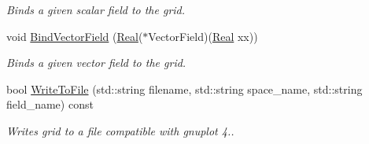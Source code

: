 \begin{DoxyCompactItemize}
\begin{DoxyCompactList}\small\item\em Binds a given scalar field to the grid. \end{DoxyCompactList}\item 
void \hyperlink{classmtk_1_1UniStgGrid1D_a5703f1f875f52f6de8f7db5a6250fafa}{Bind\+Vector\+Field} (\hyperlink{group__c01-roots_gac080bbbf5cbb5502c9f00405f894857d}{Real}($\ast$Vector\+Field)(\hyperlink{group__c01-roots_gac080bbbf5cbb5502c9f00405f894857d}{Real} xx))
\begin{DoxyCompactList}\small\item\em Binds a given vector field to the grid. \end{DoxyCompactList}\item 
bool \hyperlink{classmtk_1_1UniStgGrid1D_a6d2c10aa9468a037829f0eb043b898dc}{Write\+To\+File} (std\+::string filename, std\+::string space\+\_\+name, std\+::string field\+\_\+name) const 
\begin{DoxyCompactList}\small\item\em Writes grid to a file compatible with gnuplot 4.. \end{DoxyCompactList}\end{DoxyCompactItemize}
